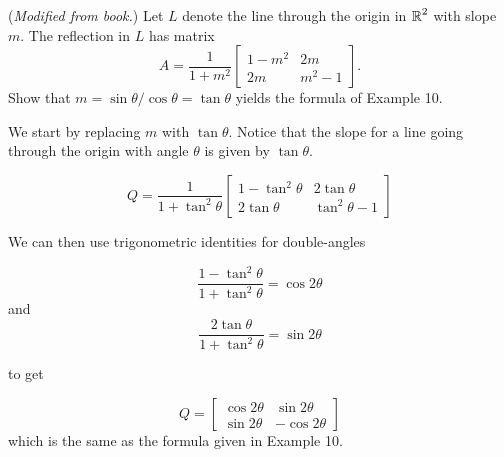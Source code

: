 \documentclass[../main.tex]{subfiles}
\begin{document}
(\emph{Modified from book.})
Let $L$ denote the line through the origin in $\operatorname{\mathbb{R}}^2$ with slope $m$.
The reflection in $L$ has matrix
\[
	A
	=
	\frac{1}{1 + m^2}
	\begin{bmatrix}
		1 - m^2 & 2m \\
		2m & m^2 - 1
	\end{bmatrix}.
\]
Show that $m = \sin\theta/\cos\theta = \tan\theta$ yields the formula of Example 10.

\solution

We start by replacing $m$ with $\tan\theta$. Notice that the slope for a line going through the
origin with angle $\theta$ is given by $\tan\theta$.

\[

    Q = \frac{1}{1+\tan^2\theta}
        \begin{bmatrix}
            1 - \tan^2\theta & 2\tan\theta\\
            2\tan\theta & \tan^2\theta-1
        \end{bmatrix}
\]

We can then use trigonometric identities for double-angles

\[
    \frac{1-\tan^2\theta}{1+\tan^2\theta} = \cos2\theta
\]
and
\[
    \frac{2\tan\theta}{1+\tan^2\theta} = \sin2\theta
\]

to get

\[ Q = \begin{bmatrix}
            \cos2\theta & \sin2\theta\\
            \sin2\theta & -\cos2\theta
        \end{bmatrix}
\]
which is the same as the formula given in Example 10.
\end{document}
